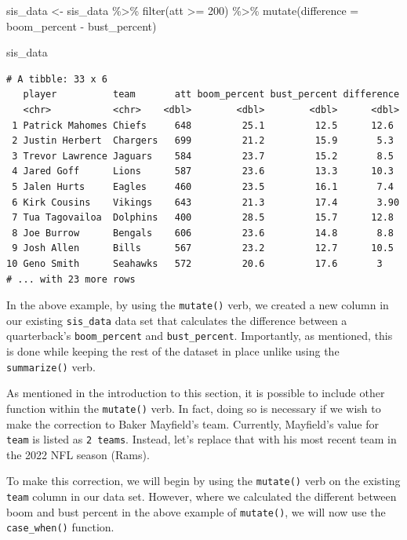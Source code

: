 \documentclass[
  letterpaper,
]{krantz}
\newenvironment{Shaded}{\begin{snugshade}}{\end{snugshade}}
\newcommand{\AttributeTok}[1]{\textcolor[rgb]{0.40,0.45,0.13}{#1}}
\newcommand{\DecValTok}[1]{\textcolor[rgb]{0.68,0.00,0.00}{#1}}
\newcommand{\FunctionTok}[1]{\textcolor[rgb]{0.28,0.35,0.67}{#1}}
\newcommand{\NormalTok}[1]{\textcolor[rgb]{0.00,0.23,0.31}{#1}}
\newcommand{\OtherTok}[1]{\textcolor[rgb]{0.00,0.23,0.31}{#1}}
\newcommand{\SpecialCharTok}[1]{\textcolor[rgb]{0.37,0.37,0.37}{#1}}
\begin{document}
\begin{Shaded}
\begin{Highlighting}[]
\NormalTok{sis\_data }\OtherTok{\textless{}{-}}\NormalTok{ sis\_data }\SpecialCharTok{\%\textgreater{}\%}
  \FunctionTok{filter}\NormalTok{(att }\SpecialCharTok{\textgreater{}=} \DecValTok{200}\NormalTok{) }\SpecialCharTok{\%\textgreater{}\%}
  \FunctionTok{mutate}\NormalTok{(}\AttributeTok{difference =}\NormalTok{ boom\_percent }\SpecialCharTok{{-}}\NormalTok{ bust\_percent)}

\NormalTok{sis\_data}
\end{Highlighting}
\end{Shaded}

\begin{verbatim}
# A tibble: 33 x 6
   player          team       att boom_percent bust_percent difference
   <chr>           <chr>    <dbl>        <dbl>        <dbl>      <dbl>
 1 Patrick Mahomes Chiefs     648         25.1         12.5      12.6 
 2 Justin Herbert  Chargers   699         21.2         15.9       5.3 
 3 Trevor Lawrence Jaguars    584         23.7         15.2       8.5 
 4 Jared Goff      Lions      587         23.6         13.3      10.3 
 5 Jalen Hurts     Eagles     460         23.5         16.1       7.4 
 6 Kirk Cousins    Vikings    643         21.3         17.4       3.90
 7 Tua Tagovailoa  Dolphins   400         28.5         15.7      12.8 
 8 Joe Burrow      Bengals    606         23.6         14.8       8.8 
 9 Josh Allen      Bills      567         23.2         12.7      10.5 
10 Geno Smith      Seahawks   572         20.6         17.6       3   
# ... with 23 more rows
\end{verbatim}

In the above example, by using the \texttt{mutate()} verb, we created a
new column in our existing \texttt{sis\_data} data set that calculates
the difference between a quarterback's \texttt{boom\_percent} and
\texttt{bust\_percent}. Importantly, as mentioned, this is done while
keeping the rest of the dataset in place unlike using the
\texttt{summarize()} verb.

As mentioned in the introduction to this section, it is possible to
include other function within the \texttt{mutate()} verb. In fact, doing
so is necessary if we wish to make the correction to Baker Mayfield's
team. Currently, Mayfield's value for \texttt{team} is listed as
\texttt{2\ teams}. Instead, let's replace that with his most recent team
in the 2022 NFL season (Rams).

To make this correction, we will begin by using the \texttt{mutate()}
verb on the existing \texttt{team} column in our data set. However,
where we calculated the different between boom and bust percent in the
above example of \texttt{mutate()}, we will now use the
\texttt{case\_when()} function.
\end{document}
